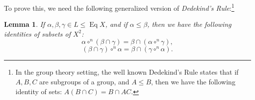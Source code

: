 \documentclass[11pt,reqno]{amsart}
\theoremstyle{plain}
\newtheorem{lemma}{Lemma}
\theoremstyle{definition}
\theoremstyle{remark}
\newcommand{\<}{\ensuremath{\langle}}
\renewcommand{\>}{\ensuremath{\rangle}}
\renewcommand{\leq}{\ensuremath{\leqslant}}
\newcommand{\Eq}{\ensuremath{\operatorname{Eq}}}
\begin{document}
To prove this, we need the following generalized version of \emph{Dedekind's 
Rule}:\footnote{In the group theory setting, the well known Dedekind's
  Rule states that if $A, B, C$ are subgroups of a group,
  and $A\leq B$, then we have the following identity of sets: $A(B\cap C) = B
  \cap AC$.}
\begin{lemma}
\label{lem:dedekind}
If $\alpha, \beta, \gamma \in L \leq \Eq X$, and if $\alpha
\leq \beta$, then we have the following identities of subsets of $X^2$:
\begin{equation}
   \label{eq:1}
   \alpha \circ^{n} (\beta \cap \gamma)= \beta \cap (\alpha \circ^{n} \gamma),
 \end{equation}
\begin{equation}
   \label{eq:2}
   (\beta \cap \gamma) \circ^{n} \alpha = \beta \cap (\gamma\circ^{n} \alpha).
 \end{equation}
\end{lemma}
\end{document}
